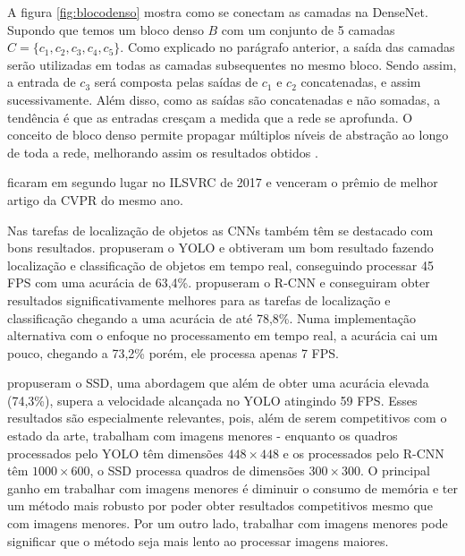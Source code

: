 A figura \ref{fig:blocodenso} mostra como se conectam as camadas na \ac{DenseNet}. Supondo que temos um bloco denso $B$ com um conjunto de 5 camadas $C = \{c_1, c_2, c_3, c_4, c_5\}$. Como explicado no parágrafo anterior, a saída das camadas serão utilizadas em todas as camadas subsequentes no mesmo bloco. Sendo assim, a entrada de $c_3$ será composta pelas saídas de $c_1$ e $c_2$ concatenadas, e assim sucessivamente. Além disso, como as saídas são concatenadas e não somadas, a tendência é que as entradas cresçam a medida que a rede se aprofunda. O conceito de bloco denso permite propagar múltiplos níveis de abstração ao longo de toda a rede, melhorando assim os resultados obtidos \cite{liu-2017}.

\citeauthor{liu-2017} ficaram em segundo lugar no \ac{ILSVRC} de 2017 e venceram o prêmio de melhor artigo da \ac{CVPR} do mesmo ano.

Nas tarefas de localização de objetos as \ac{CNN}s também têm se destacado com bons resultados.  propuseram o \ac{YOLO} e obtiveram um bom resultado fazendo localização e classificação de objetos em tempo real, conseguindo processar 45 \ac{FPS} com uma acurácia de 63,4\%.  propuseram o \ac{R-CNN} e conseguiram obter resultados significativamente melhores para as tarefas de localização e classificação chegando a uma acurácia de até 78,8\%. Numa implementação alternativa com o enfoque no processamento em tempo real, a acurácia cai um pouco, chegando a 73,2\% porém, ele processa apenas 7 \ac{FPS}.

 propuseram o \ac{SSD}, uma abordagem que além de obter uma acurácia elevada (74,3\%), supera a velocidade alcançada no \ac{YOLO} atingindo 59 \ac{FPS}. Esses resultados são especialmente relevantes, pois, além de serem competitivos com o estado da arte, trabalham com imagens menores - enquanto os quadros processados pelo \ac{YOLO} têm dimensões $448 \times 448$ e os processados pelo \ac{R-CNN} têm $1000\times 600$, o \ac{SSD} processa quadros de dimensões $300 \times 300$. O principal ganho em trabalhar com imagens menores é diminuir o consumo de memória e ter um método mais robusto por poder obter resultados competitivos mesmo que com imagens menores. Por um outro lado, trabalhar com imagens menores pode significar que o método seja mais lento ao processar imagens maiores.


